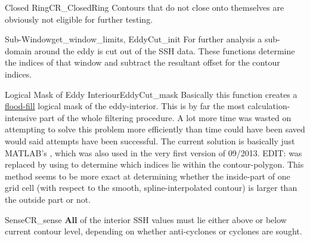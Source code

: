 \begin{filter}{Closed Ring}{CR_ClosedRing}
Contours that do not close onto themselves are obviously not eligible for
further testing.
\end{filter}\newline
\begin{filter}{Sub-Window}{get_window_limits, EddyCut_init}
For further analysis a sub-domain around the eddy is cut out of the SSH data.
These functions determine the indices of that window and subtract the
resultant offset for the contour indices.
\end{filter}\newline
\begin{filter}{Logical Mask of Eddy Interiour}{EddyCut_mask}
\label{filter:cutmask}
Basically this function creates a \href{http://en.wikipedia.org/wiki/Flood_fill}{flood-fill} logical mask of the
eddy-interior. This is by far the most calculation-intensive part of the whole
filtering procedure. A lot more time was wasted on attempting to solve this
problem more efficiently than time could have been saved would said attempts
have
been successful. The current solution is basically just MATLAB's , which was also used in the very first version of 09/2013.
EDIT:  was replaced by using  to determine which indices lie within the contour-polygon. This method seems to be more exact at determining whether the inside-part of one grid cell (with respect to the smooth, spline-interpolated contour) is larger than the outside part or not.
\end{filter}\newline
\begin{filter}{Sense}{CR_sense}
\textbf{All} of the interior SSH values must lie either above or below current
contour level, depending on whether anti-cyclones or cyclones are sought.
\end{filter}\newline
